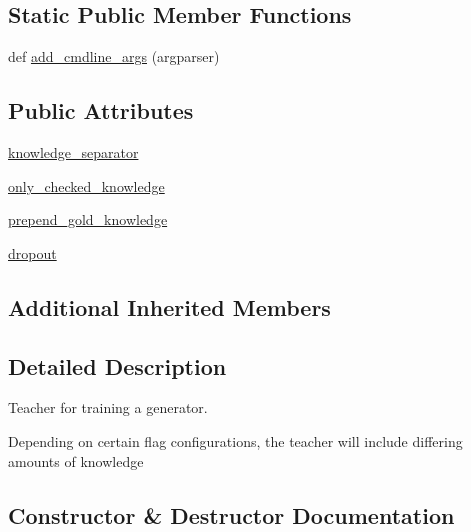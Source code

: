 \subsection*{Static Public Member Functions}
\begin{DoxyCompactItemize}
\item 
def \hyperlink{classparlai_1_1tasks_1_1wizard__of__wikipedia_1_1agents_1_1GeneratorTeacher_ae23cc01ce296734fbb1d23d8cb3ca81f}{add\+\_\+cmdline\+\_\+args} (argparser)
\end{DoxyCompactItemize}
\subsection*{Public Attributes}
\begin{DoxyCompactItemize}
\item 
\hyperlink{classparlai_1_1tasks_1_1wizard__of__wikipedia_1_1agents_1_1GeneratorTeacher_a4447c8875dd9f65e3d17ba2aec12d616}{knowledge\+\_\+separator}
\item 
\hyperlink{classparlai_1_1tasks_1_1wizard__of__wikipedia_1_1agents_1_1GeneratorTeacher_aafed07e065901daac67457e406e5dec0}{only\+\_\+checked\+\_\+knowledge}
\item 
\hyperlink{classparlai_1_1tasks_1_1wizard__of__wikipedia_1_1agents_1_1GeneratorTeacher_a83ff7bb3c705386f3b4e9ae07c0d04fe}{prepend\+\_\+gold\+\_\+knowledge}
\item 
\hyperlink{classparlai_1_1tasks_1_1wizard__of__wikipedia_1_1agents_1_1GeneratorTeacher_ab274137e75e9f6c5018376b4c61cdd32}{dropout}
\end{DoxyCompactItemize}
\subsection*{Additional Inherited Members}


\subsection{Detailed Description}
\begin{DoxyVerb}Teacher for training a generator.

Depending on certain flag configurations, the teacher will include differing amounts
of knowledge
\end{DoxyVerb}
 

\subsection{Constructor \& Destructor Documentation}
\mbox{\label{classparlai_1_1tasks_1_1wizard__of__wikipedia_1_1agents_1_1GeneratorTeacher_aebced34e7b98c204d1215e5898d16c8a}} 
